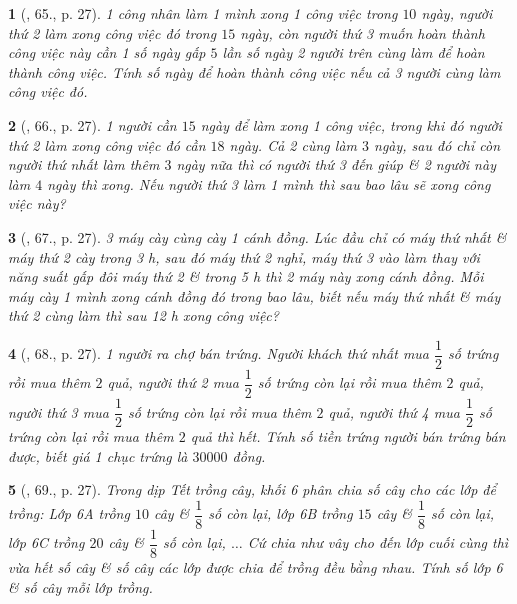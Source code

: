 \documentclass{article}
\newtheorem{baitoan}{}
\begin{document}
\begin{baitoan}[\cite{Binh_Toan_6_tap_2}, 65., p. 27]
	1 công nhân làm 1 mình xong 1 công việc trong $10$ ngày, người thứ 2 làm xong công việc đó trong $15$ ngày, còn người thứ 3 muốn hoàn thành công việc này cần 1 số ngày gấp $5$ lần số ngày 2 người trên cùng làm để hoàn thành công việc. Tính số ngày để hoàn thành công việc nếu cả 3 người cùng làm công việc đó.
\end{baitoan}

\begin{baitoan}[\cite{Binh_Toan_6_tap_2}, 66., p. 27]
	1 người cần $15$ ngày để làm xong 1 công việc, trong khi đó người thứ 2 làm xong công việc đó cần $18$ ngày. Cả 2 cùng làm $3$ ngày, sau đó chỉ còn người thứ nhất làm thêm $3$ ngày nữa thì có người thứ 3 đến giúp \& 2 người này làm $4$ ngày thì xong. Nếu người thứ 3 làm 1 mình thì sau bao lâu sẽ xong công việc này?
\end{baitoan}

\begin{baitoan}[\cite{Binh_Toan_6_tap_2}, 67., p. 27]
	3 máy cày cùng cày 1 cánh đồng. Lúc đầu chỉ có máy thứ nhất \& máy thứ 2 cày trong {\rm3 h}, sau đó máy thứ 2 nghỉ, máy thứ 3 vào làm thay với năng suất gấp đôi máy thứ 2 \& trong {\rm5 h} thì 2 máy này xong cánh đồng. Mỗi máy cày 1 mình xong cánh đồng đó trong bao lâu, biết nếu máy thứ nhất \& máy thứ 2 cùng làm thì sau {\rm12 h} xong công việc?
\end{baitoan}

\begin{baitoan}[\cite{Binh_Toan_6_tap_2}, 68., p. 27]
	1 người ra chợ bán trứng. Người khách thứ nhất mua $\dfrac{1}{2}$ số trứng rồi mua thêm $2$ quả, người thứ 2 mua $\dfrac{1}{2}$ số trứng còn lại rồi mua thêm $2$ quả, người thứ 3 mua $\dfrac{1}{2}$ số trứng còn lại rồi mua thêm $2$ quả, người thứ 4 mua $\dfrac{1}{2}$ số trứng còn lại rồi mua thêm $2$ quả thì hết. Tính số tiền trứng người bán trứng bán được, biết giá 1 chục trứng là $30000$ đồng.
\end{baitoan}

\begin{baitoan}[\cite{Binh_Toan_6_tap_2}, 69., p. 27]
	Trong dịp Tết trồng cây, khối 6 phân chia số cây cho các lớp để trồng: Lớp 6A trồng $10$ cây \& $\dfrac{1}{8}$ số còn lại, lớp 6B trồng $15$ cây \& $\dfrac{1}{8}$ số còn lại, lớp 6C trồng $20$ cây \& $\dfrac{1}{8}$ số còn lại, $\ldots$ Cứ chia như vây cho đến lớp cuối cùng thì vừa hết số cây \& số cây các lớp được chia để trồng đều bằng nhau. Tính số lớp 6 \& số cây mỗi lớp trồng.
\end{baitoan}
\end{document}
